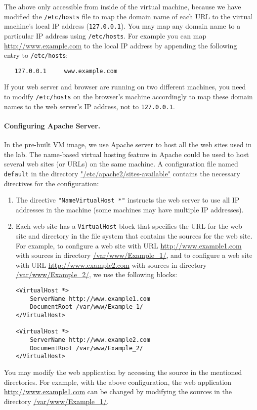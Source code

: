 

The above \urlisorurlsare only accessible from inside of the virtual machine, because we
have modified the \texttt{/etc/hosts} file to map the domain
name of each URL to the virtual machine's local IP
address ({\tt 127.0.0.1}).
You may map any domain name to a particular IP address using 
\texttt{/etc/hosts}. For example you can map
\url{http://www.example.com} to the local IP address by appending the
following entry to \texttt{/etc/hosts}:
\begin{verbatim}
   127.0.0.1     www.example.com 
\end{verbatim}
If your web server and browser are running on two different machines, you
need to modify \texttt{/etc/hosts} on the browser's machine accordingly
to map these domain names to the web server's IP address, not
to {\tt 127.0.0.1}.


\paragraph{Configuring Apache Server.}
In the pre-built VM image, we use Apache server to host all the web
sites used in the lab. The name-based virtual hosting feature in
Apache could be used to host several web sites (or URLs) on the same
machine. A configuration file named {\tt default} in the directory
\url{"/etc/apache2/sites-available"} contains the necessary directives for the
configuration:

\begin{enumerate}
\item The directive {\tt "NameVirtualHost *"} instructs the web
  server to use all IP addresses in the machine (some machines
  may have multiple IP addresses).

\item Each web site has a {\tt VirtualHost} block that specifies the
  URL for the web site and directory in the file system that contains
  the sources for the web site. For example, to configure a web site
  with URL \url{http://www.example1.com} with sources in directory
  \url{/var/www/Example_1/}, and to configure a web site
  with URL \url{http://www.example2.com} with sources in directory
  \url{/var/www/Example_2/},
  we use the following blocks:

\begin{Verbatim}[frame=single]
<VirtualHost *>
    ServerName http://www.example1.com
    DocumentRoot /var/www/Example_1/
</VirtualHost>

<VirtualHost *>
    ServerName http://www.example2.com
    DocumentRoot /var/www/Example_2/
</VirtualHost>
\end{Verbatim}

\end{enumerate}

You may modify the web application by accessing the source in the
mentioned directories. For example, with the above configuration,
the web application \url{http://www.example1.com} can be changed by modifying
the sources in the directory \url{/var/www/Example_1/}.


